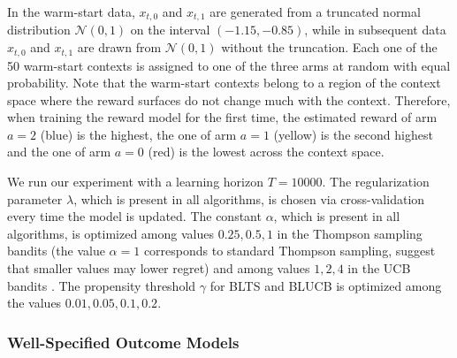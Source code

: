 \documentclass[letterpaper]{article} %
\begin{document}
In the warm-start data, $x_{t,0}$ and $x_{t,1}$ are generated from a truncated normal distribution $\mathcal{N}(0, 1)$ on the interval $(-1.15, -0.85)$, while in subsequent data $x_{t,0}$ and $x_{t,1}$ are drawn from $\mathcal{N}(0, 1)$ without the truncation.
Each one of the 50 warm-start contexts is assigned to one of the three arms at random with equal probability. 
Note that the warm-start contexts belong to a region of the context space where the reward surfaces do not change much with the context. 
Therefore, when training the reward model for the first time, the estimated reward of arm $a = 2$ (blue) is the highest, the one of arm $a = 1$ (yellow) is the second highest and the one of arm $a = 0$ (red) is the lowest across the context space. 

We run our experiment with a learning horizon $T = 10000$. The regularization parameter $\lambda$, which is present in all algorithms, is chosen via cross-validation every time the model is updated. The constant $\alpha$, which is present in all algorithms, is optimized among values $0.25, 0.5, 1$ in the Thompson sampling bandits (the value $\alpha=1$ corresponds to standard Thompson sampling, \cite{chapelle-tsucb} suggest that smaller values may lower regret) and among values $1, 2, 4$ in the UCB bandits \cite{chapelle-tsucb}. The propensity threshold $\gamma$ for BLTS and BLUCB is optimized among the values $0.01, 0.05, 0.1, 0.2$.


\subsubsection{Well-Specified Outcome Models}\label{well}
\end{document}
